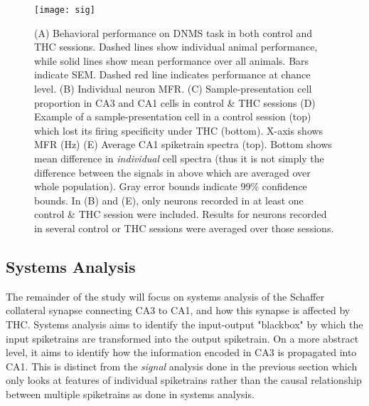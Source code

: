 \documentclass[11pt,a4paper,final]{article}
\begin{document}
\begin{figure}[!ht]
\centering
\texttt{[image: sig]}
\caption[Signal Analysis]{
(A) Behavioral performance on DNMS task in both control and THC sessions. Dashed lines show individual animal performance, while solid lines show mean performance over all animals. Bars indicate SEM. Dashed red line indicates performance at chance level.
(B) Individual neuron MFR.
(C) Sample-presentation cell proportion in CA3 and CA1 cells in control \& THC sessions
(D) Example of a sample-presentation cell in a control session (top) which lost its firing specificity under THC (bottom). X-axis shows MFR (Hz)
(E) Average CA1 spiketrain spectra (top). Bottom shows mean difference in \textit{individual} cell spectra (thus it is not simply the difference between the signals in above which are averaged over whole population). Gray error bounds indicate 99\% confidence bounds.
In (B) and (E), only neurons recorded in at least one control \& THC session were included. Results for neurons recorded in several control or THC sessions were averaged over those sessions.}
\label{sig}
\end{figure}


    \subsection{Systems Analysis}

The remainder of the study will focus on systems analysis of the Schaffer collateral synapse  connecting CA3 to CA1, and how this synapse is affected by THC.
Systems analysis aims to identify the input-output "blackbox" by which the input spiketrains are transformed into the output spiketrain.
On a more abstract level, it aims to identify how the information encoded in CA3 is propagated into CA1.
This is distinct from the \textit{signal} analysis done in the previous section which only looks at features of individual spiketrains rather than the causal relationship between multiple spiketrains as done in systems analysis.
\end{document}
